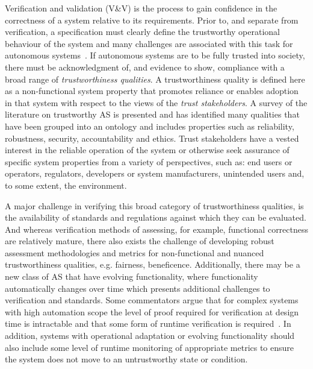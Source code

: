 Verification and validation (V\&V) is the process to gain confidence in the correctness of a system relative to its requirements. Prior to, and separate from verification, a specification must clearly define the trustworthy operational behaviour of the system and many challenges are associated with this task for autonomous systems~\cite{Abeywickrama2022}. 
%
%
If autonomous systems are to be fully trusted into society, there must be acknowledgment of, and evidence to show, compliance with a broad range of \emph{trustworthiness qualities}. 
%
A trustworthiness quality is defined here as a non-functional system property that promotes reliance or enables adoption in that system with respect to the views of the \emph{trust stakeholders}. A survey of the literature on trustworthy AS is presented and has identified many qualities that have been grouped into an ontology and includes properties such as reliability, robustness, security, accountability and ethics. 
%
Trust stakeholders have a vested interest in the reliable operation of the system or otherwise seek assurance of specific system properties from a variety of perspectives, such as: end users or operators, regulators, developers or system manufacturers, unintended users and, to some extent, the environment. 

A major challenge in verifying this broad category of trustworthiness qualities, is the availability of standards and regulations against which they can be evaluated. And whereas verification methods of assessing, for example, functional correctness are relatively mature, there also exists the challenge of developing robust assessment methodologies and metrics for non-functional and nuanced trustworthiness qualities, e.g. fairness, beneficence. Additionally, there may be a new class of AS that have evolving functionality, where functionality automatically changes over time which presents additional challenges to verification and standards. 
%
Some commentators argue that for complex systems with high automation scope the level of proof required for verification at design time is intractable and that some form of runtime verification is required~\cite{althoff2014online,CyRes20}. In addition, systems with operational adaptation or evolving functionality should also include some level of runtime monitoring of appropriate metrics to ensure the system does not move to an untrustworthy state or condition. 
%


